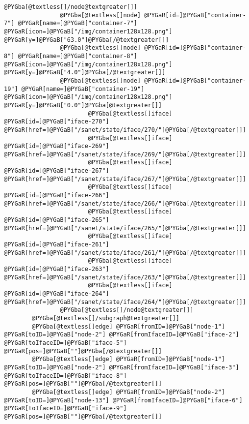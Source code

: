 \documentclass[a4wide,10pt,italian]{manual}
\begin{document}
\begin{Verbatim}[commandchars=@\[\]]
                @PYGba[@textless[]/node@textgreater[]]
                @PYGba[@textless[]node] @PYGaR[id=]@PYGaB["container-7"] @PYGaR[name=]@PYGaB["container-7"] @PYGaR[icon=]@PYGaB["/img/container128x128.png"] @PYGaR[y=]@PYGaB["63.0"]@PYGba[/@textgreater[]]
                @PYGba[@textless[]node] @PYGaR[id=]@PYGaB["container-8"] @PYGaR[name=]@PYGaB["container-8"] @PYGaR[icon=]@PYGaB["/img/container128x128.png"] @PYGaR[y=]@PYGaB["4.0"]@PYGba[/@textgreater[]]
                @PYGba[@textless[]node] @PYGaR[id=]@PYGaB["container-19"] @PYGaR[name=]@PYGaB["container-19"] @PYGaR[icon=]@PYGaB["/img/container128x128.png"] @PYGaR[y=]@PYGaB["0.0"]@PYGba[@textgreater[]]
                        @PYGba[@textless[]iface] @PYGaR[id=]@PYGaB["iface-270"] @PYGaR[href=]@PYGaB["/sanet/state/iface/270/"]@PYGba[/@textgreater[]]
                        @PYGba[@textless[]iface] @PYGaR[id=]@PYGaB["iface-269"] @PYGaR[href=]@PYGaB["/sanet/state/iface/269/"]@PYGba[/@textgreater[]]
                        @PYGba[@textless[]iface] @PYGaR[id=]@PYGaB["iface-267"] @PYGaR[href=]@PYGaB["/sanet/state/iface/267/"]@PYGba[/@textgreater[]]
                        @PYGba[@textless[]iface] @PYGaR[id=]@PYGaB["iface-266"] @PYGaR[href=]@PYGaB["/sanet/state/iface/266/"]@PYGba[/@textgreater[]]
                        @PYGba[@textless[]iface] @PYGaR[id=]@PYGaB["iface-265"] @PYGaR[href=]@PYGaB["/sanet/state/iface/265/"]@PYGba[/@textgreater[]]
                        @PYGba[@textless[]iface] @PYGaR[id=]@PYGaB["iface-261"] @PYGaR[href=]@PYGaB["/sanet/state/iface/261/"]@PYGba[/@textgreater[]]
                        @PYGba[@textless[]iface] @PYGaR[id=]@PYGaB["iface-263"] @PYGaR[href=]@PYGaB["/sanet/state/iface/263/"]@PYGba[/@textgreater[]]
                        @PYGba[@textless[]iface] @PYGaR[id=]@PYGaB["iface-264"] @PYGaR[href=]@PYGaB["/sanet/state/iface/264/"]@PYGba[/@textgreater[]]
                @PYGba[@textless[]/node@textgreater[]]
        @PYGba[@textless[]/subgraph@textgreater[]]
        @PYGba[@textless[]edge] @PYGaR[fromID=]@PYGaB["node-1"] @PYGaR[toID=]@PYGaB["node-2"] @PYGaR[fromIfaceID=]@PYGaB["iface-2"] @PYGaR[toIfaceID=]@PYGaB["iface-5"] @PYGaR[pos=]@PYGaB[""]@PYGba[/@textgreater[]]
        @PYGba[@textless[]edge] @PYGaR[fromID=]@PYGaB["node-1"] @PYGaR[toID=]@PYGaB["node-2"] @PYGaR[fromIfaceID=]@PYGaB["iface-3"] @PYGaR[toIfaceID=]@PYGaB["iface-8"] @PYGaR[pos=]@PYGaB[""]@PYGba[/@textgreater[]]
        @PYGba[@textless[]edge] @PYGaR[fromID=]@PYGaB["node-2"] @PYGaR[toID=]@PYGaB["node-13"] @PYGaR[fromIfaceID=]@PYGaB["iface-6"] @PYGaR[toIfaceID=]@PYGaB["iface-9"] @PYGaR[pos=]@PYGaB[""]@PYGba[/@textgreater[]]

\end{Verbatim}
\end{document}
